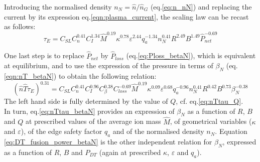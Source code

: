 Introducing the normalised density $n_N = \hat n/\hat n_G$ (eq.\ref{eq:n_nN}) and replacing the current by its expression eq.\ref{eqn:plasma_current}, the scaling law can be recast as follows:
\begin{equation*}
  \tau_E = C_{SL} C_n^{0.41} C_I^{1.34} \hat M^{0.19} \kappa^{0.78} \varepsilon^{2.44} q_a^{-1.34}
  n_N^{0.41} R^{2.49} B^{1.49} \hat P_{net}^{-0.69}
\end{equation*}

One last step is to replace $\hat P_{net}$ by $\hat P_{loss}$ (eq.\ref{eq:Ploss_betaN}), which is equivalent at equilibrium, and to use the expression of the pressure in terms of $\beta_N$ (eq.\ref{eqn:nT_betaN}) to obtain the following relation:
\begin{equation}
  (\hat n\hat T\tau_E)^{0.31} = C_{SL} C_n^{0.41} C_I^{0.96} C_\beta^{0.38} 
    C_{loss}^{-0.69}
    \hat M^{0.19} \kappa^{0.09} \varepsilon^{0.68} q_a^{-0.96}
    n_N^{0.41} R^{0.42} B^{0.73} \beta_N^{-0.38}
\label{eq:nTtau_betaN}
\end{equation}
The left hand side is fully determined by the value of $Q$, cf. eq.\ref{eq:nTtau_Q}. \\

In turn, eq.\ref{eq:nTtau_betaN} provides an expression of $\beta_N$ as a function of $R$, $B$ and $Q$ at prescribed values of the average ion mass $\hat M$, of geometrical variables ($\kappa$ and $\varepsilon$), of the edge safety factor $q_a$ and of the normalised density $n_N$.
Equation \ref{eq:DT_fusion_power_betaN} is the other independent relation for $\beta_N$, expressed as a function of $R$, $B$ and $P_{DT}$ (again at prescribed $\kappa$, $\varepsilon$ and $q_a$).




